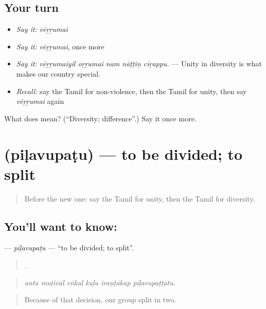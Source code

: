 \subsection*{Your turn}
\begin{itemize}
\raggedright
  \item \emph{Say it:} \emph{vēṟṟumai}
  \item \emph{Say it:} \emph{vēṟṟumai}, once more
  \item \emph{Say it:} \emph{vēṟṟumaiyil oṟṟumai nam nāṭṭiṉ ciṟappu.} — Unity in diversity is what makes our country special.
  \item \emph{Recall:} say the Tamil for non-violence, then the Tamil for unity, then say \emph{vēṟṟumai} again
\end{itemize}

\begin{tcolorbox}[breakable,colback=teal!4,colframe=teal!35!black,title={Before you move on}]
What does  mean? (\textquotedblleft{}Diversity; difference\textquotedblright{}.) Say it once more.
\end{tcolorbox}
\section[\texorpdfstring{\ta{பிளவுபடு} (piḷavupaṭu)}{பிளவுபடு (piḷavupaṭu)}]{ (piḷavupaṭu) — to be divided; to split}

\label{lesson:TA-C377-pilavupatu}



\begin{quote}
Before the new one: say the Tamil for unity, then the Tamil for diversity.
\end{quote}

\subsection*{You'll want to know: }
\textbf{} — \emph{piḷavupaṭu} — \textquotedblleft{}to be divided; to split\textquotedblright{}.

\begin{quote}
     .
\end{quote}

\begin{quote}
\emph{anta muṭivāl eṅkaḷ kuḻu iraṇṭākap piḷavupaṭṭatu.}
\end{quote}

\begin{quote}
Because of that decision, our group split in two.
\end{quote}

